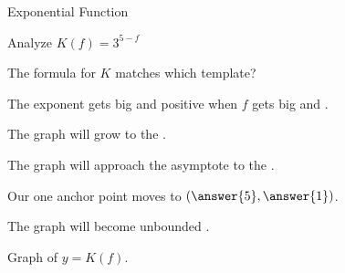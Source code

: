 \documentclass{ximera}
\begin{document}
\begin{example}  Exponential Function



Analyze   $K(f) = 3^{5-f}$ \\



\begin{idea}



\begin{question}

The formula for $K$ matches which template?

\begin{multipleChoice}
\end{multipleChoice}


\end{question}




\begin{question} 


The exponent gets big and positive when $f$ gets big and .
\end{question}
\begin{question} 


The graph will grow to the .\\
\end{question}
\begin{question}


The graph will approach the asymptote to the .\\
\end{question}
\begin{question}


Our one anchor point moves to $\left(\answer{5}, \answer{1}\right)$.
\end{question}
\begin{question} 


The graph will become unbounded .\\
\end{question}




Graph of $y = K(f)$.


\end{idea}
\end{example}
\end{document}
